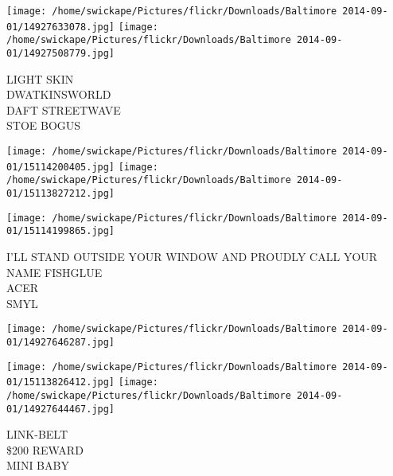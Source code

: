 \documentclass[10pt,letterpaper]{article}
\begin{document}
\texttt{[image: /home/swickape/Pictures/flickr/Downloads/Baltimore 2014-09-01/14927633078.jpg]}
\texttt{[image: /home/swickape/Pictures/flickr/Downloads/Baltimore 2014-09-01/14927508779.jpg]}

LIGHT SKIN\\
DWATKINSWORLD\\
DAFT STREETWAVE\\
STOE BOGUS
\pagebreak

\texttt{[image: /home/swickape/Pictures/flickr/Downloads/Baltimore 2014-09-01/15114200405.jpg]}
\texttt{[image: /home/swickape/Pictures/flickr/Downloads/Baltimore 2014-09-01/15113827212.jpg]}

\texttt{[image: /home/swickape/Pictures/flickr/Downloads/Baltimore 2014-09-01/15114199865.jpg]}

I'LL STAND OUTSIDE YOUR WINDOW AND PROUDLY CALL YOUR NAME FISHGLUE\\
ACER\\
SMYL
\pagebreak

\texttt{[image: /home/swickape/Pictures/flickr/Downloads/Baltimore 2014-09-01/14927646287.jpg]}

\vspace{0.25in}
\texttt{[image: /home/swickape/Pictures/flickr/Downloads/Baltimore 2014-09-01/15113826412.jpg]}
\texttt{[image: /home/swickape/Pictures/flickr/Downloads/Baltimore 2014-09-01/14927644467.jpg]}

LINK{-}BELT\\
\$200 REWARD\\
MINI BABY
\pagebreak
\end{document}
